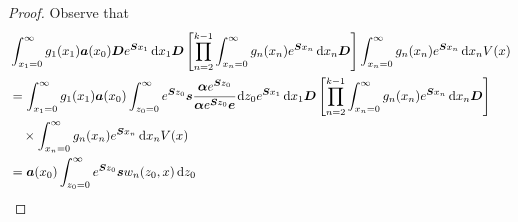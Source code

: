 \begin{proof}
	Observe that 
	\begin{align}
		\nonumber&\int_{x_1=0}^\infty g_1(x_1) \boldsymbol a (x_0) \boldsymbol D e^{\boldsymbol{S}x_1}\, \mathrm{d} x_1\boldsymbol D 
            	\left[\prod_{n=2}^{k-1}\int_{x_n=0}^\infty g_n(x_n) e^{\boldsymbol{S}x_n} \, \mathrm{d} x_n
		\boldsymbol D\right]
            	\int_{x_n=0}^\infty g_{n}(x_n) e^{\boldsymbol{S}x_n} \, \mathrm{d} x_n V(x) 
		\\\nonumber&=\int_{x_1=0}^\infty g_1(x_1) \boldsymbol a (x_0) \int_{z_0=0}^\infty e^{\boldsymbol Sz_0}\boldsymbol s\cfrac{\boldsymbol\alpha e^{\boldsymbol Sz_0}}{\boldsymbol\alpha e^{\boldsymbol Sz_0}\boldsymbol e} \, \mathrm{d} z_0 e^{\boldsymbol{S}x_1}\, \mathrm{d} x_1\boldsymbol D 
            	\left[\prod_{n=2}^{k-1}\int_{x_n=0}^\infty g_n(x_n) e^{\boldsymbol{S}x_n} \, \mathrm{d} x_n
		\boldsymbol D\right]
            	\\\nonumber&\quad\times\int_{x_n=0}^\infty g_{n}(x_n) e^{\boldsymbol{S}x_n} \, \mathrm{d} x_n V(x) 
		\\&=\boldsymbol a (x_0) \int_{z_0=0}^\infty e^{\boldsymbol Sz_0}\boldsymbol sw_n(z_0,x)\, \mathrm{d} z_0
	\end{align}
	

\end{proof}
